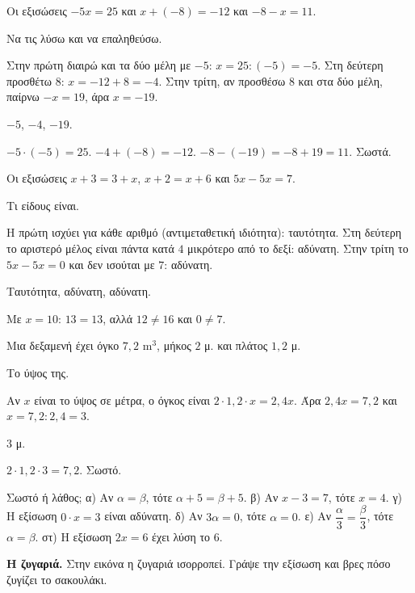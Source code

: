 \tixero Οι εξισώσεις $-5x=25$ και $x+(-8)=-12$ και $-8-x=11$.\par
\tithelo Να τις λύσω και να επαληθεύσω.\par
\possindeo Στην πρώτη διαιρώ και τα δύο μέλη με $-5$: $x=25:(-5)=-5$. Στη δεύτερη προσθέτω $8$: $x=-12+8=-4$. Στην τρίτη, αν προσθέσω $8$ και στα δύο μέλη, παίρνω $-x=19$, άρα $x=-19$.\par
\apantisi $-5$, $-4$, $-19$.\par
\elegxos $-5\cdot(-5)=25$. $-4+(-8)=-12$. $-8-(-19)=-8+19=11$. Σωστά.

\tixero Οι εξισώσεις $x+3=3+x$, $x+2=x+6$ και $5x-5x=7$.\par
\tithelo Τι είδους είναι.\par
\possindeo Η πρώτη ισχύει για κάθε αριθμό (αντιμεταθετική ιδιότητα): ταυτότητα. Στη δεύτερη το αριστερό μέλος είναι πάντα κατά $4$ μικρότερο από το δεξί: αδύνατη. Στην τρίτη το $5x-5x=0$ και δεν ισούται με $7$: αδύνατη.\par
\apantisi Ταυτότητα, αδύνατη, αδύνατη.\par
\elegxos Με $x=10$: $13=13$, αλλά $12\neq16$ και $0\neq7$.

\tixero Μια δεξαμενή έχει όγκο $7{,}2$ m$^3$, μήκος $2$ μ. και πλάτος $1{,}2$ μ.\par
\tithelo Το ύψος της.\par
\possindeo Αν $x$ είναι το ύψος σε μέτρα, ο όγκος είναι $2\cdot1{,}2\cdot x=2{,}4x$. Άρα $2{,}4x=7{,}2$ και $x=7{,}2:2{,}4=3$.\par
\apantisi $3$ μ.\par
\elegxos $2\cdot1{,}2\cdot3=7{,}2$. Σωστό.



\ex Σωστό ή λάθος; α) Αν $\alpha=\beta$, τότε $\alpha+5=\beta+5$. \quad β) Αν $x-3=7$, τότε $x=4$. \quad γ) Η εξίσωση $0\cdot x=3$ είναι αδύνατη. \quad δ) Αν $3\alpha=0$, τότε $\alpha=0$. \quad ε) Αν $\dfrac{\alpha}{3}=\dfrac{\beta}{3}$, τότε $\alpha=\beta$. \quad στ) Η εξίσωση $2x=6$ έχει λύση το $6$.

\ex \textbf{Η ζυγαριά.} Στην εικόνα η ζυγαριά ισορροπεί. Γράψε την εξίσωση και βρες πόσο ζυγίζει το σακουλάκι.
\begin{center}
\end{center}

